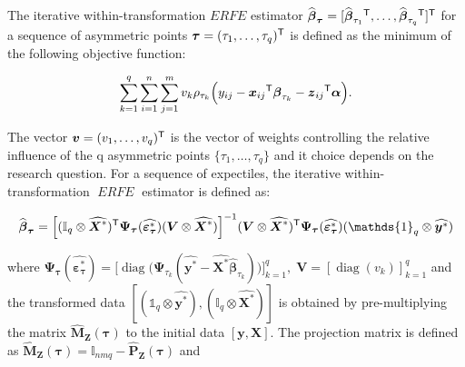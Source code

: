 \documentclass[15pt,a4paper]{article}
\DeclareMathOperator{\diag}{diag}
\newcommand{\transpose}{{}^{\text{\sffamily T}}}
\DeclareMathOperator{\ERFE}{\textit{ERFE}}
\begin{document}
The iterative within-transformation $ERFE$ estimator \(\widehat{\boldsymbol{\beta}}_{\boldsymbol{\tau}}=[\widehat{\boldsymbol{\beta}}_{\tau_1}\transpose, \ldots, \widehat{\boldsymbol{\beta}}_{\tau_q}\transpose]\transpose\) for a sequence of asymmetric points \(\boldsymbol{\tau}=(\tau_1,\ldots,\tau_q)\transpose\) is defined as the minimum of the following objective function:

\begin{equation}\label{erfe_obj_erfe}
  \sum_{k=1}^{q}\sum_{i=1}^{n}\sum_{j=1}^{m} v_k \rho_{\tau_k} \Big(  y_{ij}-\boldsymbol{x}_{ij}\transpose\boldsymbol{\beta}_{\tau_k} - \boldsymbol{z}_{ij}\transpose\boldsymbol{\alpha} \Big).  
\end{equation}

The vector \(\boldsymbol{v}=(v_1, \ldots, v_q)\transpose\) is the vector of weights controlling the relative influence of the q asymmetric points \(\lbrace \tau_1, \ldots, \tau_q\rbrace\) and it choice depends on the research question. For a sequence of expectiles, the iterative within-transformation $\ERFE$ estimator is defined as:

\begin{equation}\label{BetMultExp_erfe}
\begin{split}
    \widehat{\boldsymbol{\beta}}_{\boldsymbol{\tau}}=\Big[
    (\mathbb{I}_q\otimes\widehat{\boldsymbol{X}^{*}})\transpose \boldsymbol{\Psi}_{\boldsymbol{\tau}}(\widehat{\boldsymbol{\varepsilon}_{\boldsymbol{\tau}}^{*}})
(\boldsymbol{V}\otimes\widehat{\boldsymbol{X}^{*}})\Big]^{-1}
(\boldsymbol{V}\otimes\widehat{\boldsymbol{X}^{*}})\transpose \boldsymbol{\Psi}_{\boldsymbol{\tau}}(\widehat{\boldsymbol{\varepsilon}_{\boldsymbol{\tau}}^{*}})
(\mathds{1}_q\otimes\widehat{\boldsymbol{y}^{*}})
\end{split}
\end{equation}

where \(\boldsymbol{\Psi}_{\boldsymbol{\tau}}(\widehat{\boldsymbol{\varepsilon}_{\boldsymbol{\tau}}^{*}})=\Big[\diag\big(\boldsymbol{\Psi}_{\tau_k}(\widehat{\boldsymbol{y}^{*}}-\widehat{\boldsymbol{X}^{*}} \widehat{\boldsymbol{\beta}}_{\tau_{k}})\big)\Big]_{k=1}^{q}, \; \boldsymbol{V}=[\diag(v_k)]_{k=1}^{q}\)
and the transformed data \([(\mathds{1}_q\otimes\widehat{\boldsymbol{y}^{*}}),(\mathbb{I}_q\otimes\widehat{\boldsymbol{X}^{*}})]\) is obtained by pre-multiplying the matrix \(\widehat{\boldsymbol{M}}_{\boldsymbol{Z}}(\boldsymbol{\tau})\) to the initial data \([\boldsymbol{y},\boldsymbol{X}].\) The projection matrix is defined as \(\widehat{\boldsymbol{M}}_{\boldsymbol{Z}}(\boldsymbol{\tau})=\mathbb{I}_{nmq}-\widehat{\boldsymbol{P}}_{\boldsymbol{Z}} (\boldsymbol{\tau})\) and
\end{document}
